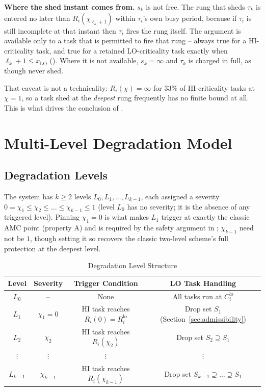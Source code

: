 \documentclass{article}
\begin{document}
\textbf{Where the shed instant comes from.} $s_k$ is not free. The rung that
sheds $\tau_k$ is entered no later than $R_i(\chi_{\ell_k + 1})$ within
$\tau_i$'s own busy period, because if $\tau_i$ is still incomplete at that
instant then $\tau_i$ fires the rung itself. The argument is available only to
a task that is permitted to fire that rung -- always true for a HI-criticality
task, and true for a retained LO-criticality task exactly when
$\ell_k + 1 \leq x_{\mathrm{LO}}$ (). Where it is not
available, $s_k = \infty$ and $\tau_k$ is charged in full, as though never shed.

That caveat is not a technicality: $R_i(\chi) = \infty$ for $33\%$ of
HI-criticality tasks at $\chi = 1$, so a task shed at the \emph{deepest} rung
frequently has no finite bound at all. This is what drives the conclusion of
.

\section{Multi-Level Degradation Model}
\label{sec:multilevel}

\subsection{Degradation Levels}

The system has $k \geq 2$ levels $L_0, L_1, \dots, L_{k-1}$, each assigned a
severity $0 = \chi_1 \leq \chi_2 \leq \dots \leq \chi_{k-1} \leq 1$ (level
$L_0$ has no severity; it is the absence of any triggered level). Pinning
$\chi_1 = 0$ is what makes $L_1$ trigger at exactly the classic AMC point
(property A) and is required by the safety argument in
; $\chi_{k-1}$ need not be $1$, though setting it so
recovers the classic two-level scheme's full protection at the deepest level.

\begin{table}[h]
\centering
\caption{Degradation Level Structure}
\begin{tabular}{cccc}
\toprule
Level & Severity & Trigger Condition & LO Task Handling \\
\midrule
$L_0$ & -- & None & All tasks run at $C_i^{\mathrm{lo}}$ \\
$L_1$ & $\chi_1 = 0$ & HI task reaches $R_i(0) = R_i^{\mathrm{lo}}$ & Drop set $S_1$ (Section~\ref{sec:admissibility}) \\
$L_2$ & $\chi_2$ & HI task reaches $R_i(\chi_2)$ & Drop set $S_2 \supseteq S_1$ \\
$\vdots$ & $\vdots$ & $\vdots$ & $\vdots$ \\
$L_{k-1}$ & $\chi_{k-1}$ & HI task reaches $R_i(\chi_{k-1})$ & Drop set $S_{k-1} \supseteq \dots \supseteq S_1$ \\
\bottomrule
\end{tabular}
\end{table}
\end{document}
